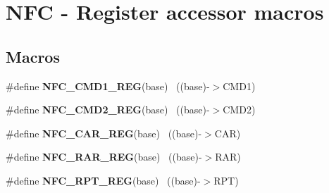 \hypertarget{group___n_f_c___register___accessor___macros}{}\section{N\+F\+C -\/ Register accessor macros}
\label{group___n_f_c___register___accessor___macros}
\subsection*{Macros}
\begin{DoxyCompactItemize}
\item 
\hypertarget{group___n_f_c___register___accessor___macros_gacda735efdd6d824cb51ecba44acac716}{}\#define {\bfseries N\+F\+C\+\_\+\+C\+M\+D1\+\_\+\+R\+E\+G}(base)                                          ~((base)-\/$>$C\+M\+D1)\label{group___n_f_c___register___accessor___macros_gacda735efdd6d824cb51ecba44acac716}

\item 
\hypertarget{group___n_f_c___register___accessor___macros_ga660f1ea3bb1cf70313266119d42fdc6e}{}\#define {\bfseries N\+F\+C\+\_\+\+C\+M\+D2\+\_\+\+R\+E\+G}(base)                                          ~((base)-\/$>$C\+M\+D2)\label{group___n_f_c___register___accessor___macros_ga660f1ea3bb1cf70313266119d42fdc6e}

\item 
\hypertarget{group___n_f_c___register___accessor___macros_gab6665200aa1c174bd1ac137d971a00ed}{}\#define {\bfseries N\+F\+C\+\_\+\+C\+A\+R\+\_\+\+R\+E\+G}(base)                                            ~((base)-\/$>$C\+A\+R)\label{group___n_f_c___register___accessor___macros_gab6665200aa1c174bd1ac137d971a00ed}

\item 
\hypertarget{group___n_f_c___register___accessor___macros_gad9052c7c9d96c1252cba666694a391a7}{}\#define {\bfseries N\+F\+C\+\_\+\+R\+A\+R\+\_\+\+R\+E\+G}(base)                                            ~((base)-\/$>$R\+A\+R)\label{group___n_f_c___register___accessor___macros_gad9052c7c9d96c1252cba666694a391a7}

\item 
\hypertarget{group___n_f_c___register___accessor___macros_ga05da3de438b72fa68f6fd72b39f30468}{}\#define {\bfseries N\+F\+C\+\_\+\+R\+P\+T\+\_\+\+R\+E\+G}(base)                                            ~((base)-\/$>$R\+P\+T)\label{group___n_f_c___register___accessor___macros_ga05da3de438b72fa68f6fd72b39f30468}


\end{DoxyCompactItemize}
